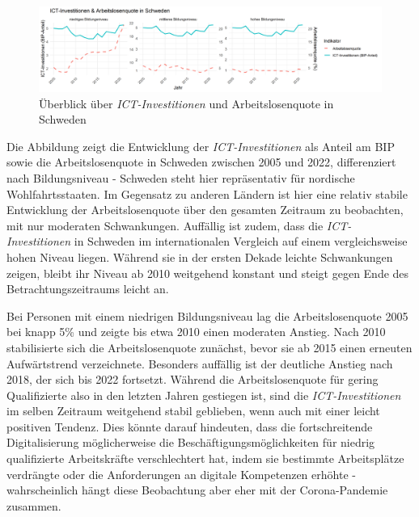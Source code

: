 \begin{figure}[htbp]
    \centering
    \includegraphics[width=\textwidth]{assets/plot_sweden.png}
    \caption{Überblick über \textit{\ac{ICT}-Investitionen} und Arbeitslosenquote in 
    Schweden}
    \label{fig:sweden}
\end{figure}

Die Abbildung zeigt die Entwicklung der \textit{\ac{ICT}-Investitionen} als Anteil 
am BIP sowie die Arbeitslosenquote in Schweden zwischen 2005 und 2022, differenziert 
nach Bildungsniveau - Schweden steht hier repräsentativ für nordische 
Wohlfahrtsstaaten. Im Gegensatz zu anderen Ländern ist hier eine relativ stabile 
Entwicklung der Arbeitslosenquote über den gesamten Zeitraum zu beobachten, mit nur 
moderaten Schwankungen. Auffällig ist zudem, dass die \textit{\ac{ICT}-Investitionen} 
in Schweden im internationalen Vergleich auf einem vergleichsweise hohen Niveau liegen. 
Während sie in der ersten Dekade leichte Schwankungen zeigen, bleibt ihr Niveau ab 
2010 weitgehend konstant und steigt gegen Ende des Betrachtungszeitraums leicht an.

Bei Personen mit einem niedrigen Bildungsniveau lag die Arbeitslosenquote 2005 bei knapp 
5\% und zeigte bis etwa 2010 einen moderaten Anstieg. Nach 2010 stabilisierte sich die 
Arbeitslosenquote zunächst, bevor sie ab 2015 einen erneuten Aufwärtstrend verzeichnete. 
Besonders auffällig ist der deutliche Anstieg nach 2018, der sich bis 2022 fortsetzt. 
Während die Arbeitslosenquote für gering Qualifizierte also in den letzten Jahren 
gestiegen ist, sind die \textit{\ac{ICT}-Investitionen} im selben Zeitraum weitgehend 
stabil geblieben, wenn auch mit einer leicht positiven Tendenz. Dies könnte darauf 
hindeuten, dass die fortschreitende Digitalisierung möglicherweise die 
Beschäftigungsmöglichkeiten für niedrig qualifizierte Arbeitskräfte verschlechtert hat, 
indem sie bestimmte Arbeitsplätze verdrängte oder die Anforderungen an digitale 
Kompetenzen erhöhte - wahrscheinlich hängt diese Beobachtung aber eher mit der 
Corona-Pandemie zusammen.

